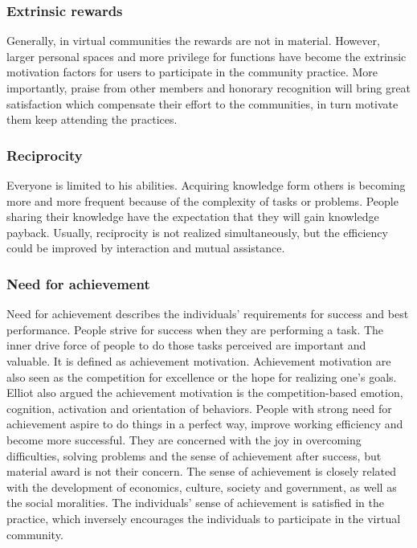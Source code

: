\documentclass[doublespacing]{elsarticle}
\begin{document}
\subsubsection{Extrinsic rewards}
\label{sec:extrinsic-rewards}


   Generally, in virtual communities the rewards are
  not  in material. However, larger personal spaces and more
  privilege for functions have become the extrinsic motivation factors
  for users to participate in the community practice.  More
  importantly,  praise from other members and
honorary recognition will bring great satisfaction which compensate
their effort to the communities, in turn motivate them keep
attending the practices\cite{Zhugea}.

\subsubsection{Reciprocity}
\label{sec:reciprocity}

Everyone is limited to his abilities. Acquiring knowledge form others
is becoming more and more frequent because of the complexity of tasks
or problems. People sharing their knowledge have the expectation that
they will gain knowledge payback.  Usually, reciprocity is not realized simultaneously, but the
efficiency could be improved by interaction and mutual assistance.

\subsubsection{Need for achievement}
\label{sec:need-achievement}


 Need for achievement  describes the individuals' requirements for
success and best performance.  People  strive for success when they are performing a
task. The inner drive force of people to do those tasks perceived
are important and valuable\cite{mitzel1982encyclopedia}. It is defined as achievement
motivation.  Achievement
motivation are also seen as the competition for excellence or the hope for realizing
one's goals\cite{clark1994emc}.  
Elliot also argued  the achievement motivation is the
competition-based emotion, cognition, activation and orientation of
behaviors\cite{elliot1999aaa}.  People
with strong need for achievement aspire to do things in a perfect way,
improve working efficiency and become more successful\cite{mcclelland1976am}. They are
concerned with the joy in overcoming difficulties, solving problems
and the sense of achievement after success, but material award is not
their concern. The sense of achievement is closely related with the
development of economics, culture, society and government, as well as the
social moralities. The  individuals' sense of achievement  is
satisfied in the practice, which inversely encourages the individuals
to participate in the virtual community. 
\end{document}
